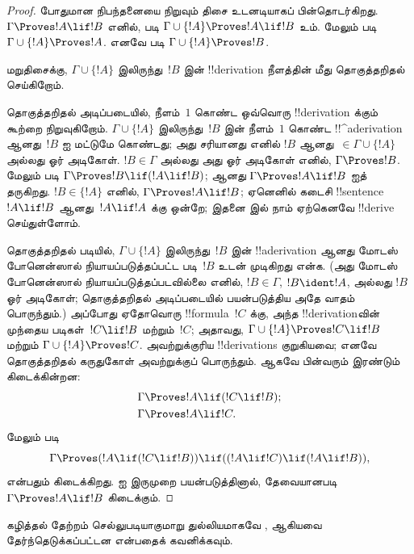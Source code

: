 \documentclass[../../../include/open-logic-section]{subfiles}
\begin{document}
\begin{proof}
போதுமான நிபந்தனையை நிறுவும் திசை உடனடியாகப் பின்தொடர்கிறது. $\Gamma \Proves !A \lif !B$ எனில்,
 படி $\Gamma \cup \{!A\} \Proves !A \lif
!B$ உம். மேலும்  படி $\Gamma \cup \{!A\}
\Proves !A$. எனவே  படி $\Gamma \cup \{!A\} \Proves !B$.

மறுதிசைக்கு, $\Gamma \cup \{!A\}$ இலிருந்து~$!B$ இன் !!{derivation}
நீளத்தின் மீது தொகுத்தறிதல் செய்கிறோம்.

தொகுத்தறிதல் அடிப்படையில், நீளம்~$1$ கொண்ட ஒவ்வொரு !!{derivation} க்கும்
கூற்றை நிறுவுகிறோம். $\Gamma \cup \{!A\}$ இலிருந்து~$!B$ இன் நீளம்~$1$
கொண்ட !!^a{derivation} ஆனது~$!B$ ஐ மட்டுமே கொண்டது; அது சரியானது எனில்
$!B$ ஆனது~$\in \Gamma \cup \{!A\}$ அல்லது ஓர் அடிகோள். $!B \in \Gamma$
அல்லது அது ஓர் அடிகோள் எனில், $\Gamma \Proves !B$. மேலும்
 படி $\Gamma \Proves !B \lif (!A \lif !B)$;
 ஆனது $\Gamma \Proves !A \lif !B$ ஐத் தருகிறது. $!B \in
\{ !A\}$ எனில், $\Gamma \Proves !A \lif !B$; ஏனெனில் கடைசி
!!{sentence}~$!A \lif !B$ ஆனது~$!A \lif !A$ க்கு ஒன்றே; இதனை
 இல் நாம் ஏற்கெனவே !!{derive} செய்துள்ளோம்.

தொகுத்தறிதல் படியில், $\Gamma \cup \{!A\}$ இலிருந்து~$!B$ இன்
!!a{derivation} ஆனது மோடஸ் போனென்ஸால் நியாயப்படுத்தப்பட்ட படி~$!B$ உடன்
முடிகிறது என்க. (அது மோடஸ் போனென்ஸால் நியாயப்படுத்தப்படவில்லை எனில்,
$!B \in \Gamma$, $!B \ident !A$, அல்லது $!B$ ஓர் அடிகோள்; தொகுத்தறிதல்
அடிப்படையில் பயன்படுத்திய அதே வாதம் பொருந்தும்.) அப்போது ஏதோவொரு
!!{formula}~$!C$ க்கு, அந்த !!{derivation}வின் முந்தைய படிகள்~$!C \lif !B$
மற்றும்~$!C$; அதாவது, $\Gamma \cup \{!A\} \Proves !C \lif !B$ மற்றும்
$\Gamma \cup \{!A\} \Proves !C$. அவற்றுக்குரிய !!{derivation}s குறுகியவை;
எனவே தொகுத்தறிதல் கருதுகோள் அவற்றுக்குப் பொருந்தும். ஆகவே பின்வரும்
இரண்டும் கிடைக்கின்றன:
\begin{align*}
  & \Gamma \Proves !A \lif (!C \lif !B); \\
  & \Gamma \Proves !A \lif !C.
\end{align*}
மேலும்  படி
\[
\Gamma \Proves (!A \lif (!C \lif !B)) \lif
((!A\lif !C)  \lif (!A \lif !B)),
\]
என்பதும் கிடைக்கிறது.  ஐ இருமுறை பயன்படுத்தினால்,
தேவையானபடி $\Gamma \Proves !A \lif !B$ கிடைக்கும்.
\end{proof}

கழித்தல் தேற்றம் செல்லுபடியாகுமாறு துல்லியமாகவே ,
 ஆகியவை தேர்ந்தெடுக்கப்பட்டன என்பதைக் கவனிக்கவும்.
\end{document}
